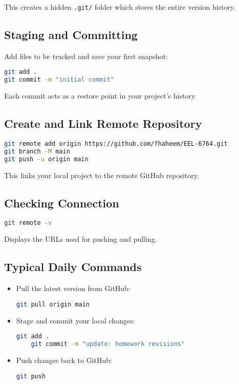\documentclass[11pt,letterpaper]{article}
\newcommand{\code}[1]{\textcolor{codeorange}{\texttt{#1}}}
\begin{document}
This creates a hidden \code{.git/} folder which stores the entire version history.

\subsection{Staging and Committing}
Add files to be tracked and save your first snapshot:
\begin{lstlisting}[language=bash]
git add .
git commit -m "initial commit"
\end{lstlisting}

Each commit acts as a restore point in your project’s history.


\subsection{Create and Link Remote Repository}
\begin{lstlisting}[language=bash]
git remote add origin https://github.com/fhaheem/EEL-6764.git
git branch -M main
git push -u origin main
\end{lstlisting}

This links your local project to the remote GitHub repository.

\subsection{Checking Connection}
\begin{lstlisting}[language=bash]
git remote -v
\end{lstlisting}

Displays the URLs used for pushing and pulling.


\subsection{Typical Daily Commands}
\begin{itemize}
    \item Pull the latest version from GitHub:
    \begin{lstlisting}[language=bash]
    git pull origin main
    \end{lstlisting}

    \item Stage and commit your local changes:
    \begin{lstlisting}[language=bash]
    git add .
    git commit -m "update: homework revisions"
    \end{lstlisting}

    \item Push changes back to GitHub:
    \begin{lstlisting}[language=bash]
    git push
    \end{lstlisting}
\end{itemize}
\end{document}
